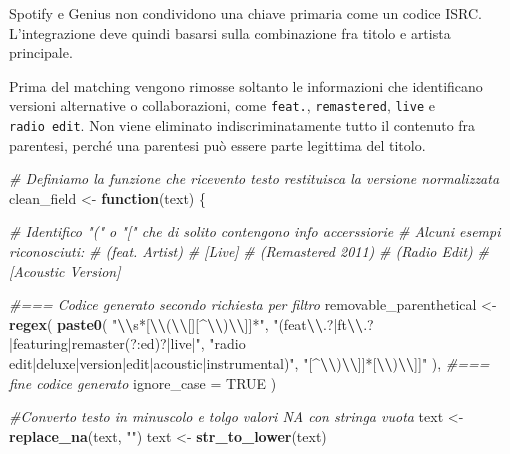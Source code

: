 \documentclass[
]{article}
\newenvironment{Shaded}{\begin{snugshade}}{\end{snugshade}}
\newcommand{\AttributeTok}[1]{\textcolor[rgb]{0.13,0.29,0.53}{#1}}
\newcommand{\CommentTok}[1]{\textcolor[rgb]{0.56,0.35,0.01}{\textit{#1}}}
\newcommand{\ConstantTok}[1]{\textcolor[rgb]{0.56,0.35,0.01}{#1}}
\newcommand{\ControlFlowTok}[1]{\textcolor[rgb]{0.13,0.29,0.53}{\textbf{#1}}}
\newcommand{\FunctionTok}[1]{\textcolor[rgb]{0.13,0.29,0.53}{\textbf{#1}}}
\newcommand{\NormalTok}[1]{#1}
\newcommand{\OtherTok}[1]{\textcolor[rgb]{0.56,0.35,0.01}{#1}}
\newcommand{\SpecialCharTok}[1]{\textcolor[rgb]{0.81,0.36,0.00}{\textbf{#1}}}
\newcommand{\StringTok}[1]{\textcolor[rgb]{0.31,0.60,0.02}{#1}}
\begin{document}
Spotify e Genius non condividono una chiave primaria come un codice
ISRC. L'integrazione deve quindi basarsi sulla combinazione fra titolo e
artista principale.

Prima del matching vengono rimosse soltanto le informazioni che
identificano versioni alternative o collaborazioni, come \texttt{feat.},
\texttt{remastered}, \texttt{live} e \texttt{radio\ edit}. Non viene
eliminato indiscriminatamente tutto il contenuto fra parentesi, perché
una parentesi può essere parte legittima del titolo.

\begin{Shaded}
\begin{Highlighting}[]
\CommentTok{\# Definiamo la funzione che ricevento testo restituisca la versione normalizzata}
\NormalTok{clean\_field }\OtherTok{\textless{}{-}} \ControlFlowTok{function}\NormalTok{(text) \{}

  \CommentTok{\# Identifico "(" o "[" che di solito contengono info accerssiorie}
  \CommentTok{\# Alcuni esempi riconosciuti:}
  \CommentTok{\# (feat. Artist)}
  \CommentTok{\# [Live]}
  \CommentTok{\# (Remastered 2011)}
  \CommentTok{\# (Radio Edit)}
  \CommentTok{\# [Acoustic Version]}
  
  \CommentTok{\#=== Codice generato secondo richiesta per filtro}
\NormalTok{  removable\_parenthetical }\OtherTok{\textless{}{-}} \FunctionTok{regex}\NormalTok{(}
    \FunctionTok{paste0}\NormalTok{(}
      \StringTok{"}\SpecialCharTok{\textbackslash{}\textbackslash{}}\StringTok{s*[}\SpecialCharTok{\textbackslash{}\textbackslash{}}\StringTok{(}\SpecialCharTok{\textbackslash{}\textbackslash{}}\StringTok{[][\^{}}\SpecialCharTok{\textbackslash{}\textbackslash{}}\StringTok{)}\SpecialCharTok{\textbackslash{}\textbackslash{}}\StringTok{]]*"}\NormalTok{,}
      \StringTok{"(feat}\SpecialCharTok{\textbackslash{}\textbackslash{}}\StringTok{.?|ft}\SpecialCharTok{\textbackslash{}\textbackslash{}}\StringTok{.?|featuring|remaster(?:ed)?|live|"}\NormalTok{,}
      \StringTok{"radio edit|deluxe|version|edit|acoustic|instrumental)"}\NormalTok{,}
      \StringTok{"[\^{}}\SpecialCharTok{\textbackslash{}\textbackslash{}}\StringTok{)}\SpecialCharTok{\textbackslash{}\textbackslash{}}\StringTok{]]*[}\SpecialCharTok{\textbackslash{}\textbackslash{}}\StringTok{)}\SpecialCharTok{\textbackslash{}\textbackslash{}}\StringTok{]]"}
\NormalTok{    ),}
  \CommentTok{\#=== fine codice generato}
    \AttributeTok{ignore\_case =} \ConstantTok{TRUE}
\NormalTok{  )}
  
  \CommentTok{\#Converto testo in minuscolo e tolgo valori NA con stringa vuota}
\NormalTok{  text }\OtherTok{\textless{}{-}} \FunctionTok{replace\_na}\NormalTok{(text, }\StringTok{""}\NormalTok{)}
\NormalTok{  text }\OtherTok{\textless{}{-}} \FunctionTok{str\_to\_lower}\NormalTok{(text)}


\end{Highlighting}
\end{Shaded}
\end{document}
